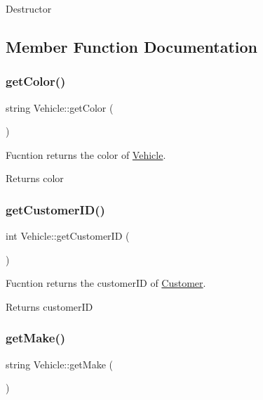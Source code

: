 Destructor 

\subsection{Member Function Documentation}
\mbox{\label{class_vehicle_a94445efb02e754a205520bf39789e031}} 
\subsubsection{\texorpdfstring{get\+Color()}{getColor()}}
{\footnotesize\ttfamily string Vehicle\+::get\+Color (\begin{DoxyParamCaption}{ }\end{DoxyParamCaption})}

Fucntion returns the color of \hyperlink{class_vehicle}{Vehicle}. \begin{DoxyReturn}{Returns}
color 
\end{DoxyReturn}
\mbox{\label{class_vehicle_a47dba04c728156ee3e2447cd7d3745c0}} 
\subsubsection{\texorpdfstring{get\+Customer\+I\+D()}{getCustomerID()}}
{\footnotesize\ttfamily int Vehicle\+::get\+Customer\+ID (\begin{DoxyParamCaption}{ }\end{DoxyParamCaption})}

Fucntion returns the customer\+ID of \hyperlink{class_customer}{Customer}. \begin{DoxyReturn}{Returns}
customer\+ID 
\end{DoxyReturn}
\mbox{\label{class_vehicle_afc39d455c65b61ffe827127edb92bfc5}} 
\subsubsection{\texorpdfstring{get\+Make()}{getMake()}}
{\footnotesize\ttfamily string Vehicle\+::get\+Make (\begin{DoxyParamCaption}{ }\end{DoxyParamCaption})}

